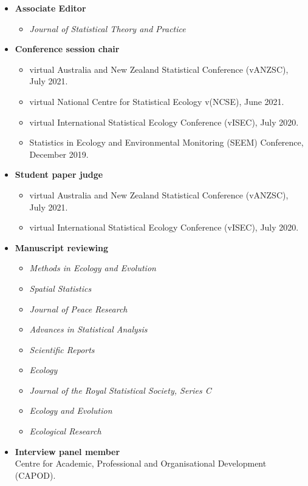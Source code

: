\documentclass[10pt,a4paper]{moderncv}
\begin{document}
\begin{itemize}
\item \textbf{Associate Editor}
  \begin{itemize}
  \item \textit{Journal of Statistical Theory and Practice}
  \end{itemize}
\item \textbf{Conference session chair}
  \begin{itemize}
  \item virtual Australia and New Zealand Statistical Conference (vANZSC), July 2021.
  \item virtual National Centre for Statistical Ecology v(NCSE), June 2021.
  \item virtual International Statistical Ecology Conference (vISEC), July 2020.
  \item Statistics in Ecology and Environmental Monitoring (SEEM) Conference, December 2019.
  \end{itemize}
\item \textbf{Student paper judge}
  \begin{itemize}
  \item virtual Australia and New Zealand Statistical Conference (vANZSC), July 2021.
  \item virtual International Statistical Ecology Conference (vISEC), July 2020.
  \end{itemize}
\item \textbf{Manuscript reviewing}
  \begin{itemize}
  \item \textit{Methods in Ecology and Evolution}
  \item \textit{Spatial Statistics}
  \item \textit{Journal of Peace Research}
  \item \textit{Advances in Statistical Analysis}
  \item   \textit{Scientific Reports}
  \item \textit{Ecology}
  \item  \textit{Journal of the Royal Statistical Society, Series C}
  \item   \textit{Ecology and Evolution}
  \item   \textit{Ecological Research}
  \end{itemize}
\item \textbf{Interview panel member}\\
  Centre for Academic, Professional and Organisational Development (CAPOD).
\end{itemize}
\end{document}
